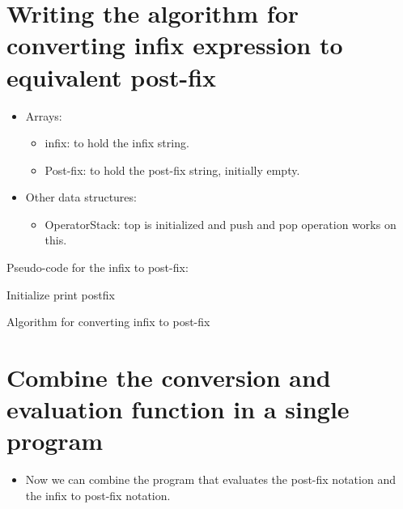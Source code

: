 \section{Writing the algorithm for converting infix expression to equivalent post-fix}
\begin{itemize}
    \item Arrays:
        \begin{itemize}
            \item infix: to hold the infix string. 
            \item Post-fix: to hold the post-fix string, initially empty.
        \end{itemize}
    
    \item Other data structures:
        \begin{itemize}
            \item OperatorStack: top is initialized and push and pop operation works on this. 
        \end{itemize}
\end{itemize}
Pseudo-code for the infix to post-fix: 
\begin{center}
    \begin{algorithm}[H]
        \SetAlgoLined
        \large
        Initialize\;
        print postfix\;
        \caption{Algorithm for converting infix to post-fix}
    \end{algorithm}
\end{center}


\section{Combine the conversion and evaluation function in a single program}
\begin{itemize}
    \item Now we can combine the program that evaluates the post-fix notation and the infix to post-fix notation.
\end{itemize}



